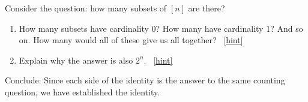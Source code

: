\documentclass{book}
\begin{document}
\setcounter{project}{78}
\addtocounter{project}{-1}
\begin{activity}[]\label{activity-pascalrow-dc}
\hypertarget{p-616}{}%
Consider the question: how many subsets of \([n]\) are there?%
\begin{enumerate}[font=\bfseries,label=(\alph*),ref=\alph*]
\item\label{task-112} \hypertarget{p-617}{}%
How many subsets have cardinality 0?  How many have cardinality 1?  And so on.  How many would all of these give us all together?%
~\hfill{\tiny\hyperlink{a-78.a}{[hint]}\hypertarget{q-78.a}{}}\item\label{task-113} \hypertarget{p-620}{}%
Explain why the answer is also \(2^n\).%
~\hfill{\tiny\hyperlink{a-78.b}{[hint]}\hypertarget{q-78.b}{}}\end{enumerate}
\bigbreak
\hypertarget{p-623}{}%
Conclude: Since each side of the identity is the answer to the same counting question, we have established the identity.%
\end{activity}
\end{document}
